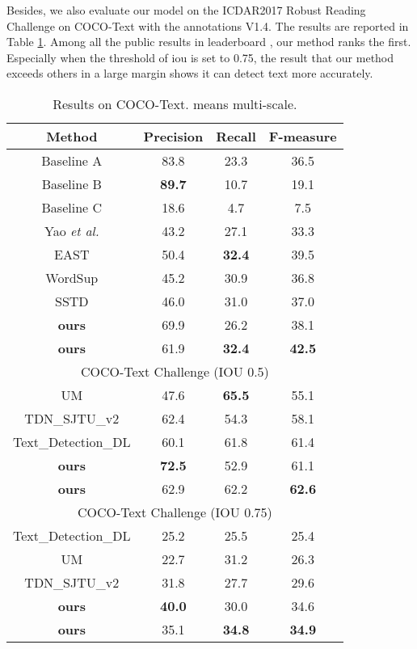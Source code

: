 \documentclass[10pt,twocolumn,letterpaper]{article}
\begin{document}
Besides, we also evaluate our model on the ICDAR2017 Robust Reading Challenge on COCO-Text \cite{COCO-Text-Challenge} with the annotations V1.4. The results are reported in Table \ref{tab_coco}. Among all the public results in leaderboard \cite{COCO-Text-Challenge}, our method ranks the first. Especially when the threshold of iou is set to 0.75, the result that our method exceeds others in a large margin shows it can detect text more accurately.

\begin{table}
\small

\begin{centering}
\begin{tabular}{|c|c|c|c|}
\hline 
\textbf{Method} & \textbf{Precision} & \textbf{Recall} & \textbf{F-measure}  \tabularnewline
\hline 
\hline
Baseline A  \cite{veit2016coco} & 83.8 & 23.3 &  36.5\tabularnewline

\hline 
Baseline B \cite{veit2016coco} & \textbf{89.7}  & 10.7  & 19.1 \tabularnewline

\hline 
Baseline C \cite{veit2016coco} & 18.6  & 4.7 & 7.5 \tabularnewline
\hline 
Yao \emph{et al.} \cite{yao2016scene} & 43.2  & 27.1 & 33.3 \tabularnewline
\hline 
EAST \cite{Zhou_2017_CVPR}   & 50.4  & \textbf{32.4} & 39.5  \tabularnewline
\hline 
WordSup \cite{Hu_2017_ICCV} & 45.2  & 30.9 & 36.8 \tabularnewline
\hline 
SSTD \cite{SSTD} & 46.0  &  31.0 & 37.0 \tabularnewline
\hline 
\textbf{ours}    &69.9  & 26.2 & 38.1    \tabularnewline
\hline 

\textbf{ours} & 61.9 & \textbf{32.4} & \textbf{42.5}  \tabularnewline

\hline
\multicolumn{4}{|c|}{COCO-Text Challenge (IOU 0.5)}\tabularnewline
\hline
UM \cite{COCO-Text-Challenge} & 47.6   & \textbf{65.5}  & 55.1   \tabularnewline
\hline
TDN\_SJTU\_v2 \cite{COCO-Text-Challenge} & 62.4   & 54.3  & 58.1   \tabularnewline

\hline
Text\_Detection\_DL \cite{COCO-Text-Challenge} & 60.1 & 61.8  & 61.4   \tabularnewline

\hline
\textbf{ours} & \textbf{72.5} & 52.9 & 61.1  \tabularnewline

\hline
\textbf{ours} & 62.9 & 62.2 & \textbf{62.6}  \tabularnewline

\hline 
\multicolumn{4}{|c|}{COCO-Text Challenge (IOU 0.75)}\tabularnewline
\hline
Text\_Detection\_DL \cite{COCO-Text-Challenge} & 25.2 & 25.5  & 25.4  \tabularnewline
\hline
UM \cite{COCO-Text-Challenge} & 22.7   & 31.2  & 26.3   \tabularnewline

\hline
TDN\_SJTU\_v2 \cite{COCO-Text-Challenge} & 31.8   & 27.7  &  29.6   \tabularnewline

\hline
\textbf{ours} & \textbf{40.0} & 30.0 & 34.6  \tabularnewline

\hline
\textbf{ours} & 35.1 & \textbf{34.8} & \textbf{34.9}  \tabularnewline

\hline
\end{tabular}
\par\end{centering}
\caption{Results on COCO-Text.   means multi-scale.}
\label{tab_coco}
\vspace{-3mm}
\end{table}
\end{document}
